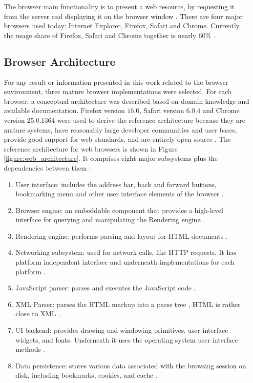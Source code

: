 The browser main functionality is to present a web resource, by requesting it from the server and displaying it on the browser window \cite{Traffic2013}. There are four major browsers used today: Internet Explorer, Firefox, Safari and Chrome. Currently, the usage share of Firefox, Safari and Chrome together is nearly 60\% \cite{Traffic2013}.


\subsection{Browser Architecture} %
\label{sub:basic_concepts:web:browser_architecture}

For any result or information presented in this work related to the browser environment, three mature browser implementations were selected. For each browser, a conceptual architecture was described based on domain knowledge and available documentation. Firefox version $16.0$, Safari version $6.0.4$ and Chrome version $25.0.1364$ were used to derive the reference architecture because they are mature systems, have reasonably large developer communities and user bases, provide good support for web standards, and are entirely open source \cite{WC2006,Grosskurth2005}. The reference architecture for web browsers is shown in Figure \ref{figure:web_architecture}. It comprises eight major subsystems plus the dependencies between them \cite{Grosskurth2005}:

\begin{enumerate}
  \item User interface: includes the address bar, back and forward buttons, bookmarking menu and other user interface elements of the browser \cite{Grosskurth2005}.
  \item Browser engine: an embeddable component that provides a high-level interface for querying and manipulating the Rendering engine \cite{Grosskurth2005,Rocks2013}.
  \item Rendering engine: performs parsing and layout for HTML documents \cite{Grosskurth2005,Rocks2013}.
  \item Networking subsystem: used for network calls, like HTTP requests. It has platform independent interface and underneath implementations for each platform \cite{Grosskurth2005,Rocks2013}.
  \item JavaScript parser: parses and executes the JavaScript \cite{International2009} code \cite{Grosskurth2005}.
  \item XML Parser: parses the HTML markup into a parse tree \cite{Hickson2013}, HTML is rather close to XML \cite{Rocks2013,Hickson2013}.
  \item UI backend: provides drawing and windowing primitives, user interface widgets, and fonts. Underneath it uses the operating system user interface methods \cite{Grosskurth2005}.
  \item Data persistence: stores various data associated with the browsing session on disk, including bookmarks, cookies, and cache \cite{Grosskurth2005,Rocks2013}.
\end{enumerate}

